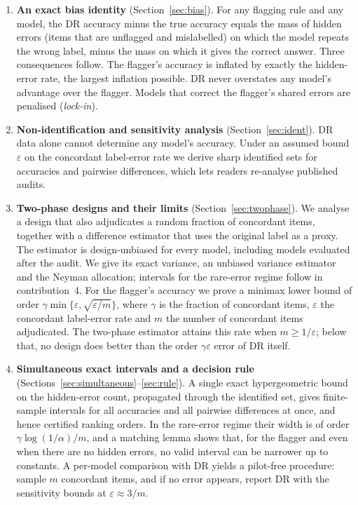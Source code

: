 \documentclass[twoside,11pt]{article}
\newcommand{\1}{\mathbf{1}}
\begin{document}
\begin{enumerate}
\item \textbf{An exact bias identity} (Section~\ref{sec:bias}). For any flagging rule and any model, the DR accuracy minus the true accuracy equals the mass of hidden errors (items that are unflagged and mislabelled) on which the model repeats the wrong label, minus the mass on which it gives the correct answer. Three consequences follow. The flagger's accuracy is inflated by exactly the hidden-error rate, the largest inflation possible. DR never overstates any model's advantage over the flagger. Models that correct the flagger's shared errors are penalised (\emph{lock-in}).
\item \textbf{Non-identification and sensitivity analysis} (Section~\ref{sec:ident}). DR data alone cannot determine any model's accuracy. Under an assumed bound $\varepsilon$ on the concordant label-error rate we derive sharp identified sets for accuracies and pairwise differences, which lets readers re-analyse published audits.
\item \textbf{Two-phase designs and their limits} (Section~\ref{sec:twophase}). We analyse a design that also adjudicates a random fraction of concordant items, together with a difference estimator that uses the original label as a proxy. The estimator is design-unbiased for every model, including models evaluated after the audit. We give its exact variance, an unbiased variance estimator and the Neyman allocation; intervals for the rare-error regime follow in contribution~4. For the flagger's accuracy we prove a minimax lower bound of order $\gamma\min\{\varepsilon,\sqrt{\varepsilon/m}\}$, where $\gamma$ is the fraction of concordant items, $\varepsilon$ the concordant label-error rate and $m$ the number of concordant items adjudicated. The two-phase estimator attains this rate when $m\ge1/\varepsilon$; below that, no design does better than the order $\gamma\varepsilon$ error of DR itself.
\item \textbf{Simultaneous exact intervals and a decision rule} (Sections~\ref{sec:simultaneous}--\ref{sec:rule}). A single exact hypergeometric bound on the hidden-error count, propagated through the identified set, gives finite-sample intervals for all accuracies and all pairwise differences at once, and hence certified ranking orders. In the rare-error regime their width is of order $\gamma\log(1/\alpha)/m$, and a matching lemma shows that, for the flagger and even when there are no hidden errors, no valid interval can be narrower up to constants. A per-model comparison with DR yields a pilot-free procedure: sample $m$ concordant items, and if no error appears, report DR with the sensitivity bounds at $\varepsilon\approx3/m$.

\end{enumerate}
\end{document}
